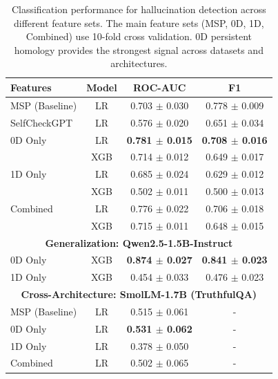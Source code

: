 \documentclass[11pt,a4paper]{article}
\begin{document}
\begin{table}[h]
\centering
\begin{tabular}{lccc}
\toprule
\textbf{Features} & \textbf{Model} & \textbf{ROC-AUC} & \textbf{F1} \\
\midrule
MSP (Baseline) & LR & 0.703 $\pm$ 0.030 & 0.778 $\pm$ 0.009 \\
SelfCheckGPT & LR & 0.576 $\pm$ 0.020 & 0.651 $\pm$ 0.034 \\
\midrule
0D Only & LR & \textbf{0.781 $\pm$ 0.015} & \textbf{0.708 $\pm$ 0.016} \\
 & XGB & 0.714 $\pm$ 0.012 & 0.649 $\pm$ 0.017 \\
\midrule
1D Only & LR & 0.685 $\pm$ 0.024 & 0.629 $\pm$ 0.012 \\
 & XGB & 0.502 $\pm$ 0.011 & 0.500 $\pm$ 0.013 \\
\midrule
Combined & LR & 0.776 $\pm$ 0.022 & 0.706 $\pm$ 0.018 \\
 & XGB & 0.715 $\pm$ 0.011 & 0.648 $\pm$ 0.015 \\
\midrule
\midrule
\multicolumn{4}{c}{\textbf{Generalization: Qwen2.5-1.5B-Instruct}} \\
\midrule
0D Only & XGB & \textbf{0.874 $\pm$ 0.027} & \textbf{0.841 $\pm$ 0.023} \\
1D Only & XGB & 0.454 $\pm$ 0.033 & 0.476 $\pm$ 0.023 \\
\midrule
\multicolumn{4}{c}{\textbf{Cross-Architecture: SmolLM-1.7B (TruthfulQA)}} \\
\midrule
MSP (Baseline) & LR & 0.515 $\pm$ 0.061 & - \\
0D Only & LR & \textbf{0.531 $\pm$ 0.062} & - \\
1D Only & LR & 0.378 $\pm$ 0.050 & - \\
Combined & LR & 0.502 $\pm$ 0.065 & - \\
\bottomrule
\end{tabular}
\caption{Classification performance for hallucination detection across different feature sets. The main feature sets (MSP, 0D, 1D, Combined) use 10-fold cross validation. 0D persistent homology provides the strongest signal across datasets and architectures.}
\label{tab:results}
\end{table}
\end{document}

